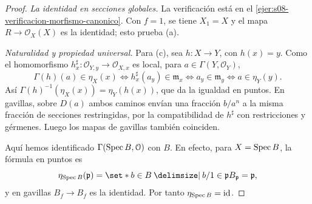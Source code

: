 \begin{proof}
\emph{La identidad en secciones globales.} La verificación está en el \cref{ejer:s08-verificacion-morfismo-canonico}. Con $f=1$, se tiene $X_1=X$ y el mapa $R\to\mathcal O_X(X)$ es la identidad; esto prueba (a).

\emph{Naturalidad y propiedad universal.} Para (c), sea $h\colon X\to Y$, con $h(x)=y$. Como el homomorfismo $h_x^\sharp\colon \mathcal O_{Y,y}\to\mathcal O_{X,x}$ es local, para $a\in\Gamma(Y,\mathcal O_Y)$,
\[
\Gamma(h)(a)\in\eta_X(x)
\iff h_x^\sharp(a_y)\in\mathfrak m_x
\iff a_y\in\mathfrak m_y
\iff a\in\eta_Y(y).
\]
Así $\Gamma(h)^{-1}(\eta_X(x))=\eta_Y(h(x))$, que da la igualdad en puntos. En gavillas, sobre $D(a)$ ambos caminos envían una fracción $b/a^n$ a la misma fracción de secciones restringidas, por la compatibilidad de $h^\sharp$ con restricciones y gérmenes. Luego los mapas de gavillas también coinciden.
\begin{center}
\begin{minipage}{.48\textwidth}
\centering
{}
\end{minipage}\hfill
\begin{minipage}{.48\textwidth}
\centering
{}
\end{minipage}
\end{center}
Aquí hemos identificado $\Gamma(\operatorname{Spec} B,\mathcal O)$ con $B$. En efecto, para $X=\operatorname{Spec} B$, la fórmula en puntos es
\[
\eta_{\Spec B}(\mathfrak p)
=\set*{b\in B\given b/1\in\mathfrak pB_{\mathfrak p}}
=\mathfrak p,
\]
y en gavillas $B_f\to B_f$ es la identidad. Por tanto $\eta_{\operatorname{Spec} B}=\operatorname{id}$.


\end{proof}
